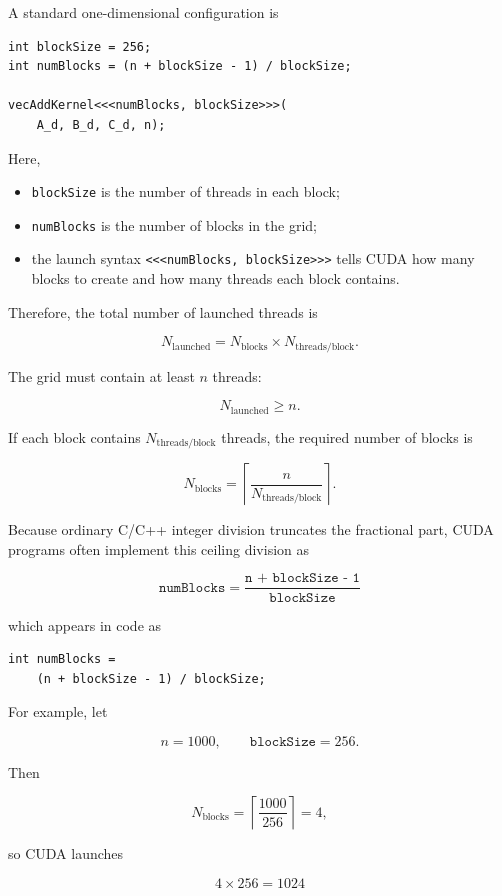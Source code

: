 \documentclass[11pt,a4paper]{article}
\begin{document}
A standard one-dimensional configuration is

\begin{lstlisting}
int blockSize = 256;
int numBlocks = (n + blockSize - 1) / blockSize;

vecAddKernel<<<numBlocks, blockSize>>>(
    A_d, B_d, C_d, n);
\end{lstlisting}

Here,

\begin{itemize}
    \item \texttt{blockSize} is the number of threads in each block;
    \item \texttt{numBlocks} is the number of blocks in the grid;
    \item the launch syntax \texttt{<<<numBlocks, blockSize>>>} tells CUDA how many blocks to create and how many threads each block contains.
\end{itemize}

Therefore, the total number of launched threads is

\[
N_{\text{launched}}
=
N_{\text{blocks}}
\times
N_{\text{threads/block}}.
\]

The grid must contain at least \(n\) threads:

\[
N_{\text{launched}} \ge n.
\]

If each block contains \(N_{\text{threads/block}}\) threads, the required number of blocks is

\[
N_{\text{blocks}}
=
\left\lceil
\frac{n}{N_{\text{threads/block}}}
\right\rceil.
\]

Because ordinary C/C++ integer division truncates the fractional part, CUDA programs often implement this ceiling division as

\[
\boxed{
\texttt{numBlocks}
=
\frac{\texttt{n + blockSize - 1}}{\texttt{blockSize}}
}
\]

which appears in code as

\begin{lstlisting}
int numBlocks =
    (n + blockSize - 1) / blockSize;
\end{lstlisting}

For example, let

\[
n=1000,
\qquad
\texttt{blockSize}=256.
\]

Then

\[
N_{\text{blocks}}
=
\left\lceil
\frac{1000}{256}
\right\rceil
=
4,
\]

so CUDA launches

\[
4\times256=1024
\]
\end{document}
